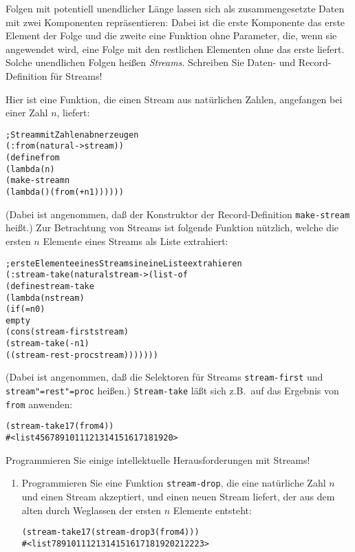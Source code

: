 \begin{aufgabe}
  Folgen mit potentiell unendlicher Länge lassen sich als
  zusammengesetzte Daten mit zwei Komponenten repräsentieren: Dabei
  ist die erste Komponente das erste Element der Folge und die zweite
  eine Funktion ohne Parameter, die, wenn sie angewendet wird, eine Folge mit
  den restlichen Elementen ohne das erste liefert.
  Solche unendlichen Folgen heißen \textit{Streams}.
  Schreiben Sie Daten- und Record-Definition für Streams!

  Hier ist eine Funktion, die einen Stream aus natürlichen Zahlen,
  angefangen bei einer Zahl $n$, liefert:
  \begin{alltt}
; Stream mit Zahlen ab n erzeugen
(: from (natural -> stream))
(define from
  (lambda (n)
    (make-stream n
                 (lambda () (from (+ n 1))))))
  \end{alltt}
  (Dabei ist angenommen, daß der Konstruktor der Record-Definition
  \texttt{make-stream} heißt.)
  Zur Betrachtung von Streams ist folgende Funktion nützlich, welche
  die ersten $n$ Elemente eines Streams als Liste extrahiert:
  \begin{alltt}
; erste Elemente eines Streams in eine Liste extrahieren
(: stream-take (natural stream -> (list-of %a)))
(define stream-take
  (lambda (n stream)
    (if (= n 0)
        empty
        (cons (stream-first stream)
                   (stream-take (- n 1)
                                ((stream-rest-proc stream)))))))
   \end{alltt}
   (Dabei ist angenommen, daß die Selektoren für Streams
   \texttt{stream-first} und \texttt{stream"=rest"=proc} heißen.)
   \texttt{Stream-take} läßt sich z.B.\ auf das Ergebnis von
   \texttt{from} anwenden:
   \begin{alltt}
(stream-take 17 (from 4))
\evalsto{} #<list 4 5 6 7 8 9 10 11 12 13 14 15 16 17 18 19 20>
   \end{alltt}
   Programmieren Sie einige intellektuelle Herausforderungen mit Streams!
   \begin{enumerate}
   \item Programmieren Sie eine Funktion \texttt{stream-drop}, die eine
     natürliche Zahl $n$ und einen Stream akzeptiert, und einen neuen
     Stream liefert, der aus dem alten durch Weglassen der ersten $n$
     Elemente entsteht:
     \begin{alltt}
(stream-take 17 (stream-drop 3 (from 4)))
\evalsto{} #<list 7 8 9 10 11 12 13 14 15 16 17 18 19 20 21 22 23>
     \end{alltt}

\end{enumerate}
\end{aufgabe}

